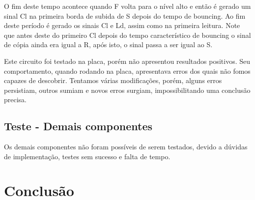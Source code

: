 \documentclass[12pt,a4paper,openany]{abntex2}
\begin{document}
O fim deste tempo acontece quando F volta para o nível alto e então é gerado um sinal Cl na primeira borda de subida de S depois do tempo de bouncing. Ao fim deste período é gerado os sinais Cl e Ld, assim como na primeira leitura. Note que antes deste do primeiro Cl depois do tempo característico de bouncing o sinal de cópia ainda era igual a R, após isto, o sinal passa a ser igual ao S.

Este circuito foi testado na placa, porém não apresentou resultados positivos. Seu comportamento, quando rodando na placa, apresentava erros dos quais não fomos capazes de descobrir. Tentamos várias modificações, porém, alguns erros persistiam, outros sumiam e novos erros surgiam, impossibilitando uma conclusão precisa.

\section{Teste - Demais componentes}

Os demais componentes não foram possíveis de serem testados, devido a dúvidas de implementação, testes sem sucesso e falta de tempo.

\chapter{Conclusão}
\end{document}
